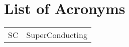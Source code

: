 \chapter*{List of Acronyms}

\begin{table}[ht]
\centering
\begin{tabular}{ll}
  SC & SuperConducting
\end{tabular}
\end{table}




